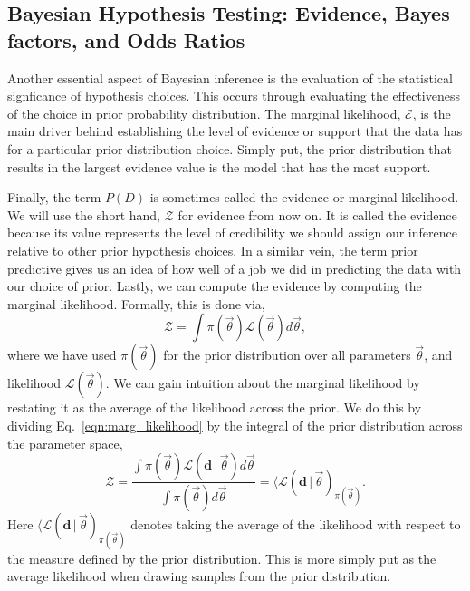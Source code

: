 \subsection{Bayesian Hypothesis Testing: Evidence, Bayes factors, and Odds Ratios}
Another essential aspect of Bayesian inference is the evaluation of the statistical signficance of hypothesis choices. This occurs through evaluating the effectiveness of the choice in prior probability distribution. The marginal likelihood, $\mathcal{E}$, is the main driver behind establishing the level of evidence or support that the data has for a particular prior distribution choice. Simply put, the prior distribution that results in the largest evidence value is the model that has the most support.

Finally, the term $P(D)$ is sometimes called the evidence or marginal likelihood. We will use the short hand, $\mathcal{Z}$ for evidence from now on. It is called the evidence because its value represents the level of credibility we should assign our inference relative to other prior hypothesis choices. In a similar vein, the term prior predictive gives us an idea of how well of a job we did in predicting the data with our choice of prior. Lastly, we can compute the evidence by computing the marginal likelihood. Formally, this is done via,
\begin{equation}\label{eqn:marg_likelihood}
    \mathcal{Z} = \int \pi(\vec{\theta}) \mathcal{L}(\vec{\theta}) d\vec{\theta},
\end{equation}
where we have used $\pi(\vec{\theta})$ for the prior distribution over all parameters $\vec{\theta}$, and likelihood $\mathcal{L}(\vec{\theta})$. We can gain intuition about the marginal likelihood by restating it as the average of the likelihood across the prior. We do this by dividing Eq.~\ref{eqn:marg_likelihood} by the integral of the prior distribution across the parameter space,
\begin{equation}
    \mathcal{Z} = \frac{\int \pi(\vec{\theta}) \mathcal{L}(\mathbf{d} \, | \, \vec{\theta}) d\vec{\theta}}
                       {\int \pi(\vec{\theta}) d\vec{\theta}} = \langle \mathcal{L}(\mathbf{d} \, | \, \vec{\theta})_{\pi(\vec{\theta})}.
\end{equation}
Here $\langle \mathcal{L}(\mathbf{d} \, | \, \vec{\theta})_{\pi(\vec{\theta})}$ denotes taking the average of the likelihood with respect to the measure defined by the prior distribution. This is more simply put as the average likelihood when drawing samples from the prior distribution.

